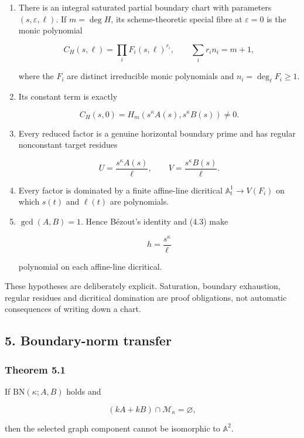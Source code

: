 \documentclass[
  11pt,
  a4paper,
]{article}
\begin{document}
\begin{enumerate}
\def\labelenumi{\arabic{enumi}.}
\item
  There is an integral saturated partial boundary chart with parameters
  \((s,\varepsilon,\ell)\). If \(m=\deg H\), its scheme-theoretic
  special fibre at \(\varepsilon=0\) is the monic polynomial

  \[
  C_H(s,\ell)=\prod_iF_i(s,\ell)^{r_i},
  \qquad \sum_i r_i n_i=m+1,
  \tag{4.1}
  \]

  where the \(F_i\) are distinct irreducible monic polynomials and
  \(n_i=\deg_\ell F_i\ge1\).
\item
  Its constant term is exactly

  \[
  C_H(s,0)=H_m(s^\kappa A(s),s^\kappa B(s))\ne0.
  \tag{4.2}
  \]
\item
  Every reduced factor is a genuine horizontal boundary prime and has
  regular nonconstant target residues

  \[
  U=\frac{s^\kappa A(s)}\ell,
  \qquad
  V=\frac{s^\kappa B(s)}\ell.
  \tag{4.3}
  \]
\item
  Every factor is dominated by a finite affine-line dicritical
  \(\mathbb A^1_t\to V(F_i)\) on which \(s(t)\) and \(\ell(t)\) are
  polynomials.
\item
  \(\gcd(A,B)=1\). Hence Bézout's identity and (4.3) make

  \[
  h=\frac{s^\kappa}{\ell}
  \]

  polynomial on each affine-line dicritical.
\end{enumerate}

These hypotheses are deliberately explicit. Saturation, boundary
exhaustion, regular residues and dicritical domination are proof
obligations, not automatic consequences of writing down a chart.

\subsection{5. Boundary-norm transfer}\label{boundary-norm-transfer}

\subsubsection{Theorem 5.1}\label{theorem-5.1}

If \(\mathrm{BN}(\kappa;A,B)\) holds and

\[
(kA+kB)\cap\mathcal M_\kappa=\varnothing,
\tag{5.1}
\]

then the selected graph component cannot be isomorphic to
\(\mathbb A^2\).
\end{document}
